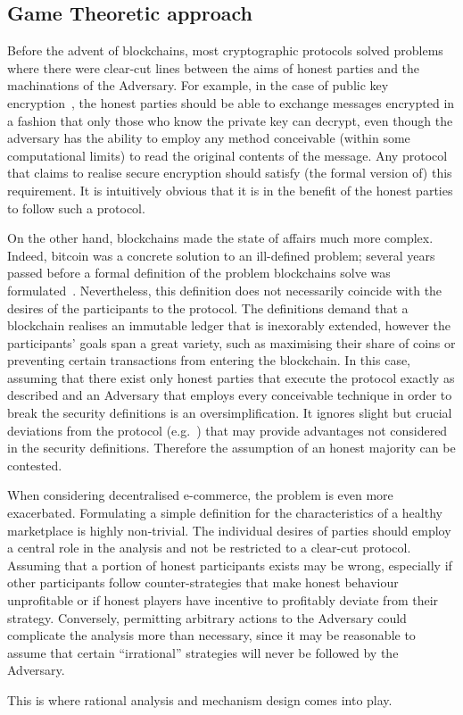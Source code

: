\subsection{Game Theoretic approach}
  Before the advent of blockchains, most cryptographic protocols solved problems where
  there were clear-cut lines between the aims of honest parties and the machinations of
  the Adversary. For example, in the case of public key encryption~\cite{dh}, the honest
  parties should be able to exchange messages encrypted in a fashion that only those who
  know the private key can decrypt, even though the adversary has the ability to employ
  any method conceivable (within some computational limits) to read the original contents
  of the message. Any protocol that claims to realise secure encryption should satisfy
  (the formal version of) this requirement. It is intuitively obvious that it is in the
  benefit of the honest parties to follow such a protocol.

  On the other hand, blockchains made the state of affairs much more complex. Indeed,
  bitcoin was a concrete solution to an ill-defined problem; several years passed before a
  formal definition of the problem blockchains solve was formulated~\cite{backbone}.
  Nevertheless, this definition does not necessarily coincide with the desires of the
  participants to the protocol. The definitions demand that a blockchain realises an
  immutable ledger that is inexorably extended, however the participants' goals span a
  great variety, such as maximising their share of coins or preventing certain
  transactions from entering the blockchain. In this case, assuming that there exist only
  honest parties that execute the protocol exactly as described and an Adversary that
  employs every conceivable technique in order to break the security definitions is an
  oversimplification. It ignores slight but crucial deviations from the protocol
  (e.g.~\cite{selfishmine}) that may provide advantages not considered in the security
  definitions. Therefore the assumption of an honest majority can be contested.

  When considering decentralised e-commerce, the problem is even more exacerbated.
  Formulating a simple definition for the characteristics of a healthy marketplace is
  highly non-trivial. The individual desires of parties should employ a central role in
  the analysis and not be restricted to a clear-cut protocol. Assuming that a portion of
  honest participants exists may be wrong, especially if other participants follow
  counter-strategies that make honest behaviour unprofitable or if honest players have
  incentive to profitably deviate from their strategy. Conversely, permitting arbitrary
  actions to the Adversary could complicate the analysis more than necessary, since it may
  be reasonable to assume that certain ``irrational'' strategies will never be followed by
  the Adversary.

  This is where rational analysis and mechanism design comes into play.
